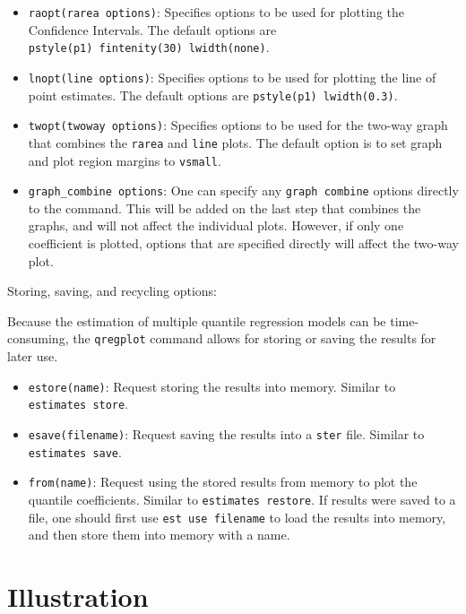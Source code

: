 \documentclass[bib]{statapress}
\providecommand{\tightlist}{%
  \setlength{\itemsep}{0pt}\setlength{\parskip}{0pt}}\usepackage{longtable,booktabs,array}
\begin{document}
\begin{itemize}
\tightlist
\item
  \texttt{raopt(rarea\ options)}: Specifies options to be used for
  plotting the Confidence Intervals. The default options are
  \texttt{pstyle(p1)\ fintenity(30)\ lwidth(none)}.
\item
  \texttt{lnopt(line\ options)}: Specifies options to be used for
  plotting the line of point estimates. The default options are
  \texttt{pstyle(p1)\ lwidth(0.3)}.
\item
  \texttt{twopt(twoway\ options)}: Specifies options to be used for the
  two-way graph that combines the \texttt{rarea} and \texttt{line}
  plots. The default option is to set graph and plot region margins to
  \texttt{vsmall}.
\item
  \texttt{graph\_combine\ options}: One can specify any
  \texttt{graph\ combine} options directly to the command. This will be
  added on the last step that combines the graphs, and will not affect
  the individual plots. However, if only one coefficient is plotted,
  options that are specified directly will affect the two-way plot.
\end{itemize}

Storing, saving, and recycling options:

Because the estimation of multiple quantile regression models can be
time-consuming, the \texttt{qregplot} command allows for storing or
saving the results for later use.

\begin{itemize}
\tightlist
\item
  \texttt{estore(name)}: Request storing the results into memory.
  Similar to \texttt{estimates\ store}.
\item
  \texttt{esave(filename)}: Request saving the results into a
  \texttt{ster} file. Similar to \texttt{estimates\ save}.
\item
  \texttt{from(name)}: Request using the stored results from memory to
  plot the quantile coefficients. Similar to
  \texttt{estimates\ restore}. If results were saved to a file, one
  should first use \texttt{est\ use\ filename} to load the results into
  memory, and then store them into memory with a name.
\end{itemize}

\section{Illustration}\label{illustration}
\end{document}
